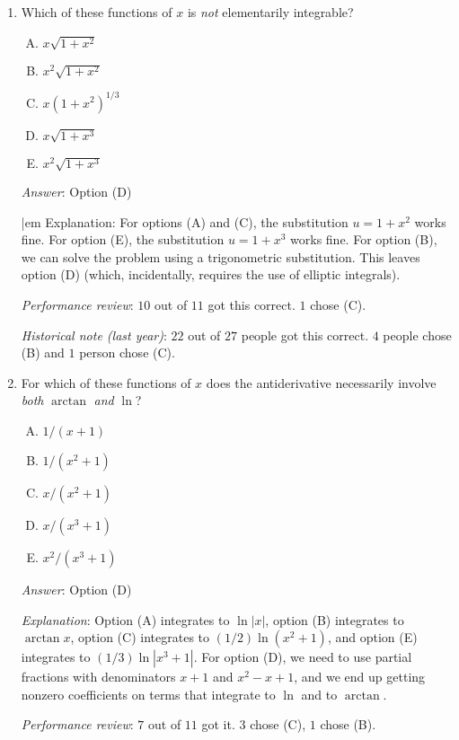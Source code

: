 \documentclass[10pt]{amsart}
\begin{document}
\begin{enumerate}
\item Which of these functions of $x$ is {\em not} elementarily
  integrable?

  \begin{enumerate}[(A)]
  \item $x\sqrt{1 + x^2}$
  \item $x^2\sqrt{1 + x^2}$
  \item $x(1 + x^2)^{1/3}$
  \item $x\sqrt{1 + x^3}$
  \item $x^2\sqrt{1 + x^3}$
  \end{enumerate}

  {\em Answer}: Option (D)

  {|em Explanation}: For options (A) and (C), the substitution $u = 1
  + x^2$ works fine. For option (E), the substitution $u = 1 + x^3$
  works fine. For option (B), we can solve the problem using a
  trigonometric substitution. This leaves option (D) (which,
  incidentally, requires the use of elliptic integrals).

  {\em Performance review}: $10$ out of $11$ got this correct. $1$
  chose (C).

  {\em Historical note (last year)}: $22$ out of $27$ people got this
  correct. $4$ people chose (B) and $1$ person chose (C).
\item For which of these functions of $x$ does the antiderivative
  necessarily involve {\em both} $\arctan$ {\em and} $\ln$?

  \begin{enumerate}[(A)]
  \item $1/(x + 1)$
  \item $1/(x^2 + 1)$
  \item $x/(x^2 + 1)$
  \item $x/(x^3 + 1)$
  \item $x^2/(x^3 + 1)$
  \end{enumerate}

  {\em Answer}: Option (D)

  {\em Explanation}: Option (A) integrates to $\ln|x|$, option (B)
  integrates to $\arctan x$, option (C) integrates to $(1/2) \ln(x^2 +
  1)$, and option (E) integrates to $(1/3) \ln|x^3 + 1|$. For option
  (D), we need to use partial fractions with denominators $x + 1$ and
  $x^2 - x + 1$, and we end up getting nonzero coefficients on terms
  that integrate to $\ln$ and to $\arctan$.

  {\em Performance review}: $7$ out of $11$ got it. $3$ chose (C), $1$
  chose (B).


\end{enumerate}
\end{document}
